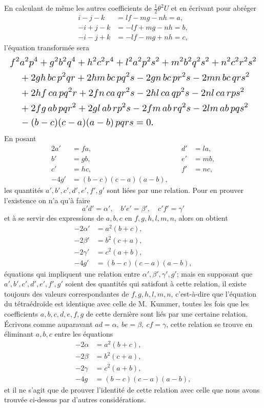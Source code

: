 \documentclass[11pt]{article}
\begin{document}
En calculant de m\^eme les autres coefficients de $\tfrac{1}{2}\theta^{2} U$ et en \'ecrivant pour abr\'eger
\begin{align*}
i - j - k &= lf - mg - nh = a, \\
-i + j - k &= -lf + mg - nh = b, \\
-i - j + k &= -lf - mg + nh = c,
\end{align*}
l'\'equation transform\'ee sera
\[
\resizebox{\textwidth}{!}{$\displaystyle
\begin{aligned}
& f^{2} a^{2} p^{4} + g^{2} b^{2} q^{4} + h^{2} c^{2} r^{4} + l^{2} a^{2} p^{2} s^{2} + m^{2} b^{2} q^{2} s^{2} + n^{2} c^{2} r^{2} s^{2} \\
& \quad + 2 g h\, bc\, p^{2} qr + 2 h m\, bc\, pq^{2} s - 2 g n\, bc\, pr^{2} s - 2 m n\, bc\, qr s^{2} \\
& \quad + 2 h f\, ca\, pq^{2} r + 2 f n\, ca\, qr^{2} s - 2 h l\, ca\, qp^{2} s - 2 n l\, ca\, rps^{2} \\
& \quad + 2 f g\, ab\, pqr^{2} + 2 g l\, ab\, rp^{2} s - 2 f m\, ab\, rq^{2} s - 2 l m\, ab\, pqs^{2} \\
& \quad - (b - c)(c - a)(a - b)\, pqrs = 0.
\end{aligned}$}
\]
En posant
\begin{alignat*}{2}
a' &= fa, & \quad d' &= la, \\
b' &= gb, & \quad e' &= mb, \\
c' &= hc, & \quad f' &= nc, \\
-4 g' &= (b - c)(c - a)(a - b),
\end{alignat*}
les quantit\'es $a', b', c', d', e', f', g'$ sont li\'ees par une relation. Pour en prouver l'existence on n'a qu'\`a faire
\[
a' d' = \alpha',\quad b' e' = \beta',\quad c' f' = \gamma'
\]
et \`a se servir des expressions de $a, b, c$ en $f, g, h, l, m, n$, alors on obtient
\begin{align*}
-2\alpha' &= a^{2}(b + c), \\
-2\beta' &= b^{2}(c + a), \\
-2\gamma' &= c^{2}(a + b), \\
-4 g' &= (b - c)(c - a)(a - b),
\end{align*}
\'equations qui impliquent une relation entre $\alpha', \beta', \gamma', g'$; mais en supposant que $a', b', c', d', e', f', g'$ soient des quantit\'es qui satisfont \`a cette relation, il existe toujours des valeurs correspondantes de $f, g, h, l, m, n$, c'est-\`a-dire que l'\'equation du t\'etra\'edro\"ide est identique avec celle de M.~Kummer, toutes les fois que les coefficients $a, b, c, d, e, f, g$ de cette derni\`ere sont li\'es par une certaine relation. \'Ecrivons comme auparavant $ad = \alpha,\ be = \beta,\ cf = \gamma$, cette relation se trouve en \'eliminant $a, b, c$ entre les \'equations
\begin{align*}
-2\alpha &= a^{2}(b + c), \\
-2\beta &= b^{2}(c + a), \\
-2\gamma &= c^{2}(a + b), \\
-4 g &= (b - c)(c - a)(a - b),
\end{align*}
et il ne s'agit que de prouver l'identit\'e de cette relation avec celle que nous avons trouv\'ee ci-dessus par d'autres consid\'erations.
\end{document}
